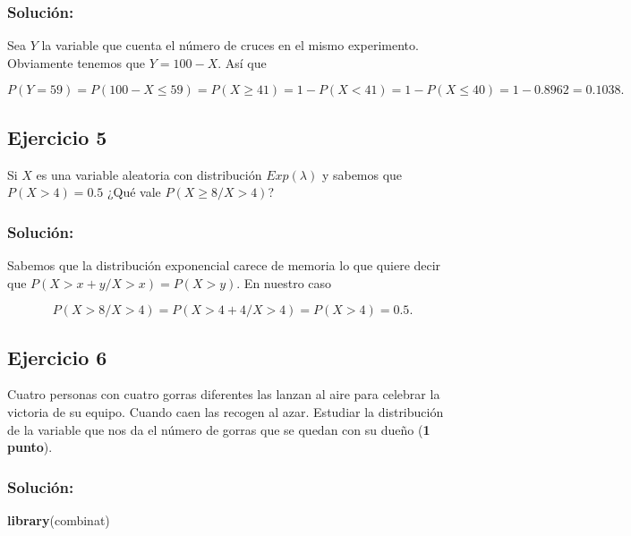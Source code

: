 \documentclass[]{article}
\newenvironment{Shaded}{\begin{snugshade}}{\end{snugshade}}
\newcommand{\KeywordTok}[1]{\textcolor[rgb]{0.13,0.29,0.53}{\textbf{#1}}}
\newcommand{\NormalTok}[1]{#1}
\begin{document}
\hypertarget{soluciuxf3n-3}{%
\subsubsection{Solución:}\label{soluciuxf3n-3}}

Sea \(Y\) la variable que cuenta el número de cruces en el mismo
experimento. Obviamente tenemos que \(Y=100-X\). Así que

\[P(Y=59)= P(100-X\leq 59) = P(X\geq 41)= 1-P(X < 41)=1-P(X\leq 40)=1-0.8962=0.1038.\]

\hypertarget{ejercicio-5}{%
\subsection{Ejercicio 5}\label{ejercicio-5}}

Si \(X\) es una variable aleatoria con distribución \(Exp(\lambda)\) y
sabemos que \(P(X>4)=0.5\) ¿Qué vale \(P(X\geq 8/X>4)\)?

\hypertarget{soluciuxf3n-4}{%
\subsubsection{Solución:}\label{soluciuxf3n-4}}

Sabemos que la distribución exponencial carece de memoria lo que quiere
decir que \(P(X> x+y/X>x)=P(X> y)\). En nuestro caso

\[P(X>8/X>4)=P(X> 4+4/X>4)=P(X>4)=0.5.\]

\hypertarget{ejercicio-6}{%
\subsection{Ejercicio 6}\label{ejercicio-6}}

Cuatro personas con cuatro gorras diferentes las lanzan al aire para
celebrar la victoria de su equipo. Cuando caen las recogen al azar.
Estudiar la distribución de la variable que nos da el número de gorras
que se quedan con su dueño (\textbf{1 punto}).

\hypertarget{soluciuxf3n-5}{%
\subsubsection{Solución:}\label{soluciuxf3n-5}}

\begin{Shaded}
\begin{Highlighting}[]
\KeywordTok{library}\NormalTok{(combinat)}
\end{Highlighting}
\end{Shaded}
\end{document}
